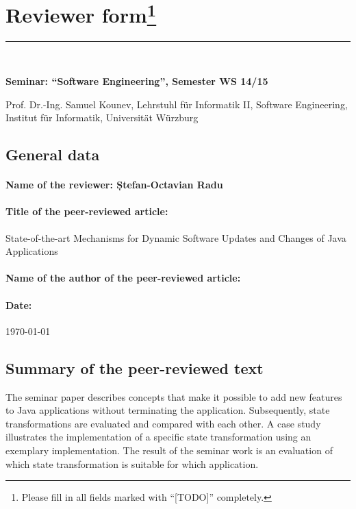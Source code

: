 \documentclass[12pt]{scrartcl}
\begin{document}
\section*{Reviewer form\footnote{Please fill in all fields marked with "`[TODO]"' completely.}}
\hrule
\ \\

\begin{center}
\textbf{Seminar: "`Software Engineering"', Semester WS 14/15}

Prof. Dr.-Ing. Samuel Kounev, Lehrstuhl für Informatik II, Software Engineering, Institut für Informatik, Universität Würzburg
\end{center}



\subsection*{General data}

\paragraph{Name of the reviewer: Ștefan-Octavian Radu}

\paragraph{Title of the peer-reviewed article:} State-of-the-art Mechanisms for Dynamic Software Updates and Changes of Java Applications


\paragraph{Name of the author of the peer-reviewed article:} 

\paragraph{Date:} \today



\subsection*{Summary of the peer-reviewed text}
The seminar paper describes concepts that make it possible to add new features to Java applications without terminating the application. Subsequently, state transformations are evaluated and compared with each other. A case study 
illustrates the implementation of a specific state transformation using an exemplary implementation. The result of the seminar work is an evaluation of which state transformation is suitable for which application. 
\end{document}
